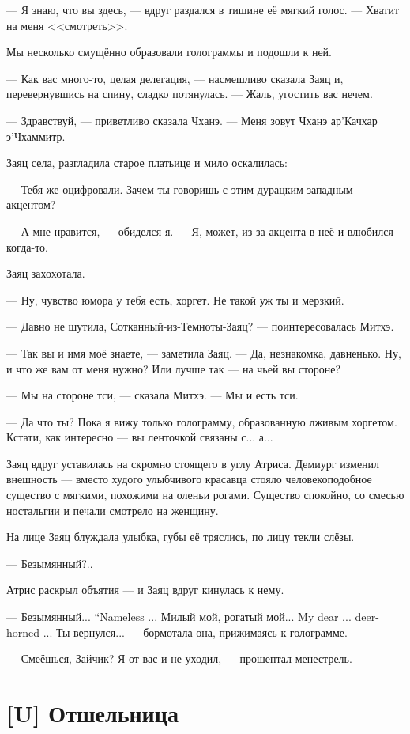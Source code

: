 --- Я знаю, что вы здесь, --- вдруг раздался в тишине её мягкий голос.
--- Хватит на меня <<смотреть>>.

Мы несколько смущённо образовали голограммы и подошли к ней.

--- Как вас много-то, целая делегация, --- насмешливо сказала Заяц и, перевернувшись на спину, сладко потянулась.
--- Жаль, угостить вас нечем.

--- Здравствуй, --- приветливо сказала Чханэ.
--- Меня зовут Чханэ ар’Качхар э’Чхаммитр.

Заяц села, разгладила старое платьице и мило оскалилась:

--- Тебя же оцифровали.
Зачем ты говоришь с этим дурацким западным акцентом?

--- А мне нравится, --- обиделся я.
--- Я, может, из-за акцента в неё и влюбился когда-то.

Заяц захохотала.

--- Ну, чувство юмора у тебя есть, хоргет.
Не такой уж ты и мерзкий.

--- Давно не шутила, Сотканный-из-Темноты-Заяц? --- поинтересовалась Митхэ.

--- Так вы и имя моё знаете, --- заметила Заяц.
--- Да, незнакомка, давненько.
Ну, и что же вам от меня нужно?
Или лучше так --- на чьей вы стороне?

--- Мы на стороне тси, --- сказала Митхэ.
--- Мы и есть тси.

--- Да что ты?
Пока я вижу только голограмму, образованную лживым хоргетом.
Кстати, как интересно --- вы ленточкой связаны с... а...

Заяц вдруг уставилась на скромно стоящего в углу Атриса.
Демиург изменил внешность --- вместо худого улыбчивого красавца стояло человекоподобное существо с мягкими, похожими на оленьи рогами.
Существо спокойно, со смесью ностальгии и печали смотрело на женщину.

На лице Заяц блуждала улыбка, губы её тряслись, по лицу текли слёзы.

--- Безымянный?..

Атрис раскрыл объятия --- и Заяц вдруг кинулась к нему.

{--- Безымянный...}
{``Nameless ...}
{Милый мой, рогатый мой...}
{My dear ... deer-horned ...}
Ты вернулся... --- бормотала она, прижимаясь к голограмме.

--- Смеёшься, Зайчик?
Я от вас и не уходил, --- прошептал менестрель.

\section{[U] Отшельница}

